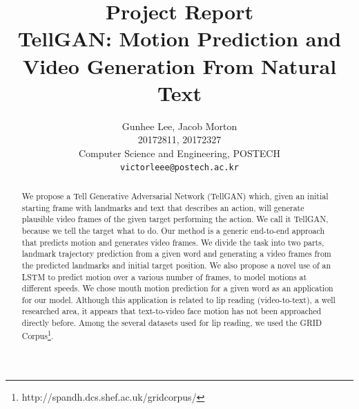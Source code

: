 \documentclass[10pt,twocolumn,letterpaper]{article}
\begin{document}
\title{Project Report\\
TellGAN: Motion Prediction and Video Generation From Natural Text}

\author{Gunhee Lee, Jacob Morton\\
20172811, 20172327\\
Computer Science and Engineering, POSTECH\\
{\tt\small victorleee@postech.ac.kr}
}


\maketitle



\begin{abstract}

 We propose a Tell Generative Adversarial Network (TellGAN) which, given an initial starting frame with landmarks and text that describes an action, will generate plausible video frames of the given target performing the action. We call it TellGAN, because we tell the target what to do. Our method is a generic end-to-end approach that predicts motion and generates video frames. We divide the task into two parts, landmark trajectory prediction from a given word and generating a video frames from the predicted landmarks and initial target position. We also propose a novel use of an LSTM to predict motion over a various number of frames, to model motions at different speeds. We chose mouth motion prediction for a given word as an application for our model. Although this application is related to lip reading (video-to-text), a well researched area, it appears that text-to-video face motion has not been approached directly before.  Among the several datasets used for lip reading, we used the GRID Corpus\footnote{http://spandh.dcs.shef.ac.uk/gridcorpus/}.
 
\end{abstract}
\end{document}
